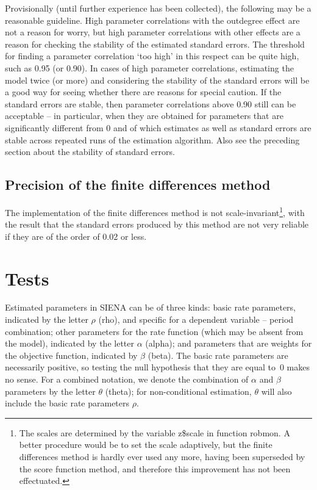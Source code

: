 \documentclass[a4paper,fleqn,11pt]{article}
\newcommand{\+}{\, + \,}
\newcommand{\sfn}[1]{\textsf{#1}}
\newcommand{\SI}{{\sf SIENA }}
\begin{document}
Provisionally (until further experience has been collected),
the following may be a reasonable guideline.
High parameter correlations with the outdegree effect are not a
reason for worry, but high parameter correlations with other effects are
a reason for checking the stability of the estimated standard errors. The
threshold for finding a parameter correlation `too high' in this respect
can be quite high, such as 0.95 (or 0.90).
In cases of high parameter correlations, estimating the model twice
(or more) and considering the stability of the standard errors will be
a good way for seeing whether there are reasons for special caution.
If the standard errors are stable, then parameter correlations above
0.90 still can be acceptable -- in particular, when they are obtained
for parameters that are significantly different from 0 and of which
estimates as well as standard errors are stable across repeated runs of
the estimation algorithm.
Also see the preceding section about the stability of standard errors.

\subsection{Precision of the finite differences method}

The implementation of the finite differences method is not
scale-invariant\footnote{The scales are determined by the
variable \sfn{z\$scale} in function \sfn{robmon}.
A better procedure would be to set the scale adaptively,
but the finite differences method is hardly ever used any more,
having been superseded by the score function method,
and therefore this improvement has not been effectuated.},
with the result that the standard errors produced by this method
are not very reliable if they are of the order of 0.02 or less.


\newpage
\section{Tests}
\label{S_test}

Estimated parameters in \SI can be of three kinds:
basic rate parameters, indicated by the letter $\rho$ (rho), and specific for a
dependent variable -- period combination; other parameters for the rate function
(which may be absent from the model), indicated by the letter $\alpha$ (alpha);
and parameters that are weights for the objective function, indicated by $\beta$ (beta).
The basic rate parameters are necessarily positive,
so testing the null hypothesis that they are equal to~0 makes no sense.
For a combined notation, we denote the combination of $\alpha$ and $\beta$ parameters
by the letter $\theta$ (theta); for non-conditional estimation,
$\theta$ will also include the basic rate parameters $\rho$.
\end{document}
